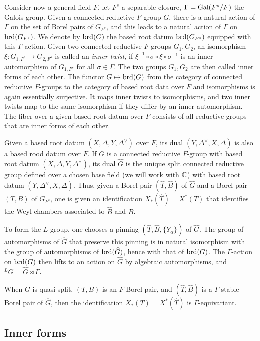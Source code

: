 \documentclass{article}
\theoremstyle{definition}
\numberwithin{equation}{section}
\renewcommand{\-}{\hyp{}}
\begin{document}
Consider now a general field $F$, let $F^s$ a separable closure, $\Gamma=\textrm{Gal}(F^s/F)$ the Galois group. Given a connected reductive $F$-group $G$, there is a natural action of $\Gamma$ on the set of Borel pairs of $G_{F^s}$, and this leads to a natural action of $\Gamma$ on $\textrm{brd}(G_{F^s})$. We denote by $\textrm{brd}(G)$ the based root datum $\textrm{brd}(G_{F^s})$ equipped with this $\Gamma$-action. Given two connected reductive $F$-groups $G_1,G_2$, an isomorphism $\xi : G_{1,F^s} \to G_{2,F^s}$ is called an \emph{inner twist}, if $\xi^{-1}\circ\sigma\circ\xi\circ\sigma^{-1}$ is an inner automorphism of $G_{1,F^s}$ for all $\sigma \in \Gamma$. The two groups $G_1,G_2$ are then called inner forms of each other. The functor $G \mapsto \textrm{brd}(G)$ from the category of connected reductive $F$-groups to the category of based root data over $F$ and isomorphisms is again essentially surjective. It maps inner twists to isomorphisms, and two inner twists map to the same isomorphism if they differ by an inner automorphism. The fiber over a given based root datum over $F$ consists of all reductive groups that are inner forms of each other.

Given a based root datum $(X,\Delta,Y,\Delta^\vee)$ over $F$, its dual $(Y,\Delta^\vee,X,\Delta)$ is also a based rood datum over $F$. If $G$ is a connected reductive $F$-group with based root datum $(X,\Delta,Y,\Delta^\vee)$, its dual $\hat G$ is the unique split connected reductive group defined over a chosen base field (we will work with $\mathbb{C}$) with based root datum $(Y,\Delta^\vee,X,\Delta)$. Thus, given a Borel pair $(\hat T,\hat B)$ of $\hat G$ and a Borel pair $(T,B)$ of $G_{F^s}$, one is given an identification $X_*(\hat T)=X^*(T)$ that identifies the Weyl chambers associated to $\hat B$ and $B$.

To form the $L$\-group, one chooses a pinning $(\hat T,\hat B,\{Y_\alpha\})$ of $\hat G$. The group of automorphisms of $\hat G$ that preserve this pinning is in natural isomorphism with the group of automorphisms of $\textrm{brd}(\widehat G)$, hence with that of $\textrm{brd}(G)$. The $\Gamma$-action on $\textrm{brd}(G)$ then lifts to an action on $\hat G$ by algebraic automorphisms, and $^LG=\hat G \rtimes \Gamma$.

When $G$ is quasi-split, $(T,B)$ is an $F$-Borel pair, and $(\hat T,\hat B)$ is a $\Gamma$-stable Borel pair of $\hat G$, then the identification $X_*(T)=X^*(\hat T)$ is $\Gamma$-equivariant.

\subsection{Inner forms}
\end{document}
